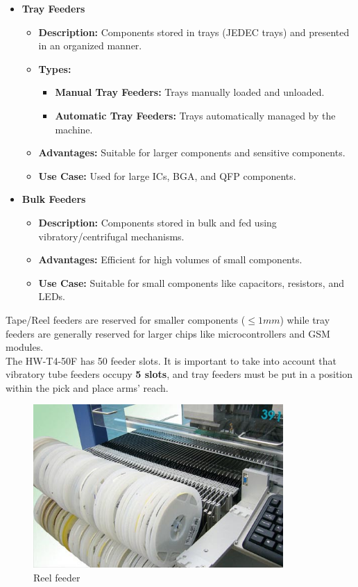\documentclass[a4paper,10pt]{report}
\begin{document}
\begin{itemize}
    \item \textbf{Tray Feeders}
    \begin{itemize}
        \item \textbf{Description:} Components stored in trays (JEDEC trays) and presented in an organized manner.
        \item \textbf{Types:}
        \begin{itemize}
            \item \textbf{Manual Tray Feeders:} Trays manually loaded and unloaded.
            \item \textbf{Automatic Tray Feeders:} Trays automatically managed by the machine.
        \end{itemize}
        \item \textbf{Advantages:} Suitable for larger components and sensitive components.
        \item \textbf{Use Case:} Used for large ICs, BGA, and QFP components.
    \end{itemize}


    \item \textbf{Bulk Feeders}
    \begin{itemize}
        \item \textbf{Description:} Components stored in bulk and fed using vibratory/centrifugal mechanisms.
        \item \textbf{Advantages:} Efficient for high volumes of small components.
        \item \textbf{Use Case:} Suitable for small components like capacitors, resistors, and LEDs.
    \end{itemize}
\end{itemize}
Tape/Reel feeders are reserved for smaller components ($\leq 1mm$) while tray feeders are generally reserved for larger chips like microcontrollers and GSM modules.\\
\newpage
The HW-T4-50F has 50 feeder slots. It is important to take into account that vibratory tube feeders occupy \textbf{5 slots}, and tray feeders must be put in a position within the pick and place arms' reach.
\begin{figure}[!htb]
 \centering
 \includegraphics[width=0.85\textwidth]{reel_tape.jpg}
 \caption{Reel feeder}
\end{figure}
\end{document}
